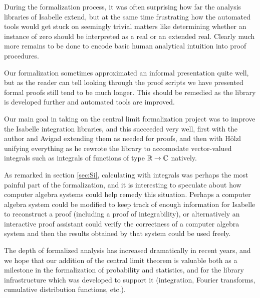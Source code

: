 \documentclass[leqno]{article}
\theoremstyle{definition}
\begin{document}
During the formalization process, it was often surprising how far the analysis libraries of Isabelle extend, but at the same time frustrating how the automated tools would get stuck on seemingly trivial matters like determining whether an instance of zero should be interpreted as a real or an extended real. Clearly much more remains to be done to encode basic human analytical intuition into proof procedures.

Our formalization sometimes approximated an informal presentation quite well, but as the reader can tell looking through the proof scripts we have presented formal proofs still tend to be much longer. This should be remedied as the library is developed further and automated tools are improved.

Our main goal in taking on the central limit formalization project was to improve the Isabelle integration libraries, and this succeeded very well, first with the author and Avigad extending them as needed for proofs, and then with H\"olzl unifying everything as he rewrote the library to accomodate vector-valued integrals such as integrals of functions of type $\mathbb{R} \rightarrow \mathbb{C}$ natively.

As remarked in section \ref{sec:Si}, calculating with integrals was perhaps the most painful part of the formalization, and it is interesting to speculate about how computer algebra systems could help remedy this situation. Perhaps a computer algebra system could be modified to keep track of enough information for Isabelle to reconstruct a proof (including a proof of integrability), or alternatively an interactive proof assistant could verify the correctness of a computer algebra system and then the results obtained by that system could be used freely.

The depth of formalized analysis has increased dramatically in recent years, and we hope that our addition of the central limit theorem is valuable both as a milestone in the formalization of probability and statistics, and for the library infrastructure which was developed to support it (integration, Fourier transforms, cumulative distribution functions, etc.).



\end{document}
